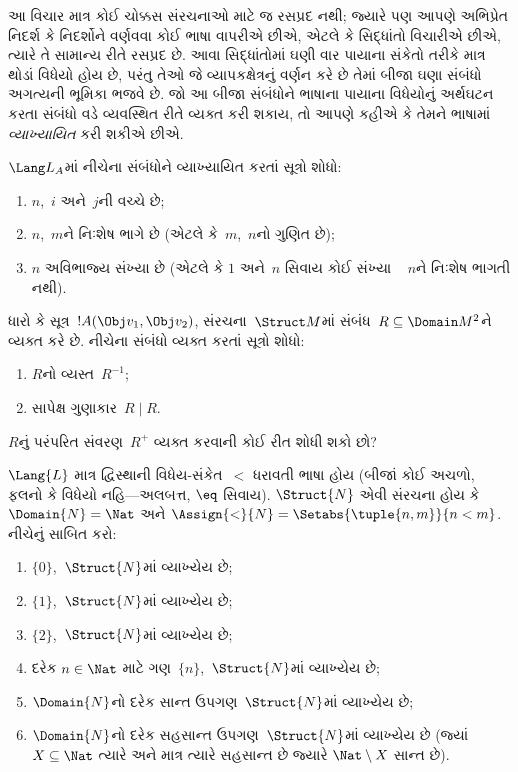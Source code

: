 \begin{explain}
આ વિચાર માત્ર કોઈ ચોક્કસ સંરચનાઓ માટે જ રસપ્રદ નથી; જ્યારે પણ
આપણે અભિપ્રેત નિદર્શ કે નિદર્શોને વર્ણવવા કોઈ ભાષા વાપરીએ છીએ, એટલે
કે સિદ્ધાંતો વિચારીએ છીએ, ત્યારે તે સામાન્ય રીતે રસપ્રદ છે. આવા
સિદ્ધાંતોમાં ઘણી વાર પાયાના સંકેતો તરીકે માત્ર થોડાં વિધેયો
હોય છે, પરંતુ તેઓ જે વ્યાપકક્ષેત્રનું વર્ણન કરે છે તેમાં બીજા ઘણા
સંબંધો અગત્યની ભૂમિકા ભજવે છે. જો આ બીજા સંબંધોને ભાષાના પાયાના
વિધેયોનું અર્થઘટન કરતા સંબંધો વડે વ્યવસ્થિત રીતે વ્યક્ત કરી
શકાય, તો આપણે કહીએ કે તેમને ભાષામાં \emph{વ્યાખ્યાયિત} કરી શકીએ છીએ.
\end{explain}

\begin{prob}
$\Lang L_A$માં નીચેના સંબંધોને વ્યાખ્યાયિત કરતાં સૂત્રો શોધો:
\begin{enumerate}
\item $n$,~$i$ અને~$j$ની વચ્ચે છે;
\item $n$,~$m$ને નિઃશેષ ભાગે છે (એટલે કે~$m$,~$n$નો ગુણિત છે);
\item $n$ અવિભાજ્ય સંખ્યા છે (એટલે કે $1$ અને~$n$ સિવાય કોઈ સંખ્યા
  ~ $n$ને નિઃશેષ ભાગતી નથી).
\end{enumerate}
\end{prob}

\begin{prob}
ધારો કે સૂત્ર~$!A(\Obj v_1,\Obj v_2)$, સંરચના~$\Struct M$માં
સંબંધ~$R\subseteq\Domain M^2$ને વ્યક્ત કરે છે. નીચેના સંબંધો વ્યક્ત
કરતાં સૂત્રો શોધો:
\begin{enumerate}
\item $R$નો વ્યસ્ત~$R^{-1}$;
\item સાપેક્ષ ગુણાકાર~$R\mid R$.
\end{enumerate}
$R$નું પરંપરિત સંવરણ~$R^+$ વ્યક્ત કરવાની કોઈ રીત શોધી શકો છો?
\end{prob}

\begin{prob}
$\Lang{L}$ માત્ર દ્વિસ્થાની વિધેય-સંકેત~$<$ ધરાવતી ભાષા હોય (બીજાં
કોઈ અચળો, ફલનો કે વિધેયો નહિ---અલબત્ત,
$\eq$ સિવાય). $\Struct{N}$ એવી સંરચના હોય કે $\Domain{N}=\Nat$ અને
$\Assign{<}{N}=\Setabs{\tuple{n,m}}{n<m}$. નીચેનું સાબિત કરો:
\begin{enumerate}
\item $\{0\}$,~$\Struct{N}$માં વ્યાખ્યેય છે;
\item $\{1\}$,~$\Struct{N}$માં વ્યાખ્યેય છે;
\item $\{2\}$,~$\Struct{N}$માં વ્યાખ્યેય છે;
\item દરેક $n\in\Nat$ માટે ગણ~$\{n\}$,~$\Struct{N}$માં વ્યાખ્યેય છે;
\item $\Domain{N}$નો દરેક સાન્ત ઉપગણ~$\Struct{N}$માં વ્યાખ્યેય છે;
\item $\Domain{N}$નો દરેક સહસાન્ત ઉપગણ~$\Struct{N}$માં વ્યાખ્યેય છે
  (જ્યાં $X\subseteq\Nat$ ત્યારે અને માત્ર ત્યારે સહસાન્ત છે જ્યારે
  $\Nat\setminus X$ સાન્ત છે).
\end{enumerate}
\end{prob}
\endgroup


